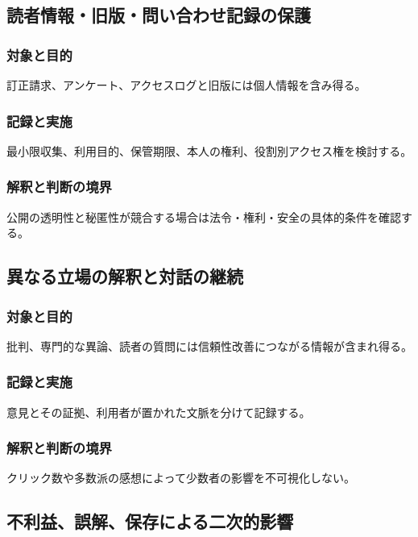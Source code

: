 \documentclass[a4paper,11pt]{article}
\begin{document}
\subsection{読者情報・旧版・問い合わせ記録の保護}
\subsubsection{対象と目的}
\par 訂正請求、アンケート、アクセスログと旧版には個人情報を含み得る。\par\medskip
\subsubsection{記録と実施}
\par 最小限収集、利用目的、保管期限、本人の権利、役割別アクセス権を検討する。\par\medskip
\subsubsection{解釈と判断の境界}
\par 公開の透明性と秘匿性が競合する場合は法令・権利・安全の具体的条件を確認する。\par\medskip
\subsection{異なる立場の解釈と対話の継続}
\subsubsection{対象と目的}
\par 批判、専門的な異論、読者の質問には信頼性改善につながる情報が含まれ得る。\par\medskip
\subsubsection{記録と実施}
\par 意見とその証拠、利用者が置かれた文脈を分けて記録する。\par\medskip
\subsubsection{解釈と判断の境界}
\par クリック数や多数派の感想によって少数者の影響を不可視化しない。\par\medskip
\subsection{不利益、誤解、保存による二次的影響}
\end{document}
